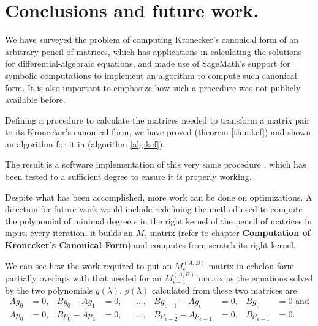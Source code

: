 \section{Conclusions and future work.}
We have surveyed the problem of computing Kronecker's canonical form of an arbitrary pencil of matrices, which has
applications in calculating the solutions for differential-algebraic equations, and made use of SageMath's \cite{sage}
support for symbolic computations to implement an algorithm to compute such canonical form. It is also important
to emphasize how such a procedure was not publicly available before.

Defining a procedure to calculate the matrices needed to transform a matrix pair to its Kronecker's canonical form,
we have proved  (theorem \ref{thm:kcf}) and shown an algorithm for it in 
(algorithm \ref{alg:kcf}).

The result is a software implementation of this very same procedure \cite{trapani-kronecker},
which has been tested to a sufficient degree to ensure it is properly working.

Despite what has been accomplished, more work can be done on optimizations. A direction for future work
would include redefining the method used to compute the polynomial of minimal degree \(\epsilon\) in the right kernel of
the pencil of matrices in input; every iteration, it builds an \(M_\epsilon\) matrix (refer to chapter
\textbf{Computation of Kronecker's Canonical Form}) and computes from scratch its right kernel.

We can see how the work required to put an \(M_{\epsilon}^{(A, B)}\) matrix in echelon form partially
overlaps with that needed for an \(M_{\epsilon-1}^{(A, B)}\) matrix as the equations solved by the two polynomials
\(g(\lambda)\), \(p(\lambda)\) calculated from these two matrices are
\begin{align*}
    Ag_{0} &= 0, &
    Bg_{0} - Ag_{1} &= 0, &
    & ..., &
    Bg_{\epsilon-1} - Ag_{\epsilon} &= 0, &
    Bg_{\epsilon} &= 0 \text{ and} \\
    Ap_{0} &= 0, &
    Bp_{0} - Ap_{1} &= 0, &
    & ..., &
    Bp_{\epsilon-2} - Ap_{\epsilon-1} &= 0, &
    Bp_{\epsilon-1} &= 0.
\end{align*}